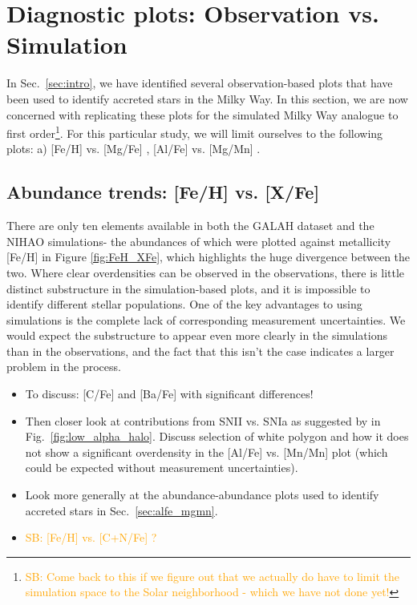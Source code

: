 \documentclass[fleqn,usenatbib]{mnras}
\newcommand{\SB}[1]{{\textcolor{orange}{SB: #1}}}
\begin{document}

\section{Diagnostic plots: Observation vs. Simulation}
\label{sec:comparison}

In Sec.~\ref{sec:intro}, we have identified several observation-based plots that have been used to identify accreted stars in the Milky Way. In this section, we are now concerned with replicating these plots for the simulated Milky Way analogue to first order\footnote{\SB{Come back to this if we figure out that we actually do have to limit the simulation space to the Solar neighborhood - which we have not done yet!}}. For this particular study, we will limit ourselves to the following plots: a) [Fe/H] vs. [Mg/Fe] \citep{Nissen2010}, [Al/Fe] vs. [Mg/Mn] \citep{Hawkins2015, Das2020}.

\subsection{Abundance trends: [Fe/H] vs. [X/Fe]} \label{sec:feh_xfe}

There are only ten elements available in both the GALAH dataset and the NIHAO simulations- the abundances of which were plotted against metallicity [Fe/H] in Figure \ref{fig:FeH_XFe}, which highlights the huge divergence between the two. Where clear overdensities can be observed in the observations, there is little distinct substructure in the simulation-based plots, and it is impossible to identify different stellar populations. One of the key advantages to using simulations is the complete lack of corresponding measurement uncertainties. We would expect the substructure to appear even more clearly in the simulations than in the observations, and the fact that this isn’t the case indicates a larger problem in the process.

\begin{itemize}
    \item To discuss: [C/Fe] and [Ba/Fe] with significant differences!
    \item Then closer look at contributions from SNII vs. SNIa as suggested by \citet{Nissen2010} in Fig.~\ref{fig:low_alpha_halo}. Discuss selection of white polygon and how it does not show a significant overdensity in the [Al/Fe] vs. [Mn/Mn] plot (which could be expected without measurement uncertainties).
    \item Look more generally at the abundance-abundance plots used to identify accreted stars in Sec.~\ref{sec:alfe_mgmn}.
    \item \SB{[Fe/H] vs. [C+N/Fe] \citep{Hawkins2015}?}
\end{itemize}
\end{document}
